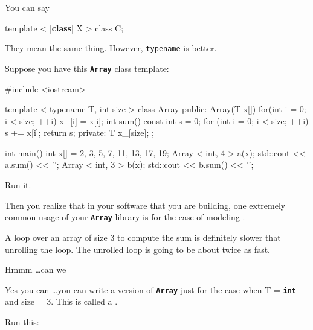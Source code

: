 You can say

\begin{consolethree}[escapeinside=||]
template  < |\textbf{class}| X >
class C{}; 
\end{consolethree}

They mean the same thing. However, \texttt{typename} is better.

\newpage{}

Suppose you have this \texttt{\textbf{Array}} class template:

\begin{console}
#include <iostream>

template < typename T, int size >
class Array
{
public:
     Array(T x[])
     {    
          for(int i = 0; i  < size; ++i)
          x_[i] = x[i];
     }
     int sum() const
     {
          int s = 0;
          for (int i = 0; i  < size; ++i)
          s += x[i];
          return s;
     }
private:
     T x_[size];
};

int main()
{    
     int x[] = {2, 3, 5, 7, 11, 13, 17, 19};
     Array < int, 4 > a(x);
     std::cout << a.sum() << '\n';
     Array < int, 3 > b(x);
     std::cout << b.sum() << '\n';
} 
\end{console}

Run it.

Then you realize that in your software that you are building, one extremely common usage of your \texttt{\textbf{Array}} library is for the case of modeling .

A loop over an array of size 3 to compute the sum is definitely slower that unrolling the loop. The unrolled loop is going to be about twice as fast.

Hmmm \ldots can we 

Yes you can \ldots you can write a version of \texttt{\textbf{Array}} just for the case when T = \texttt\textbf{int} and size = 3. This is called a \EMPHASIZE{}.

Run this:

